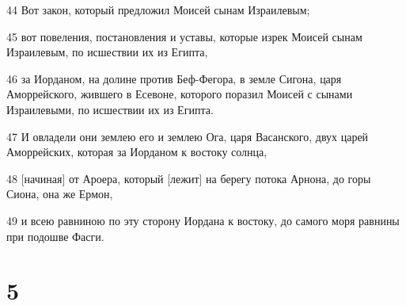 \par 44 Вот закон, который предложил Моисей сынам Израилевым;
\par 45 вот повеления, постановления и уставы, которые изрек Моисей сынам Израилевым, по исшествии их из Египта,
\par 46 за Иорданом, на долине против Беф-Фегора, в земле Сигона, царя Аморрейского, жившего в Есевоне, которого поразил Моисей с сынами Израилевыми, по исшествии их из Египта.
\par 47 И овладели они землею его и землею Ога, царя Васанского, двух царей Аморрейских, которая за Иорданом к востоку солнца,
\par 48 [начиная] от Ароера, который [лежит] на берегу потока Арнона, до горы Сиона, она же Ермон,
\par 49 и всею равниною по эту сторону Иордана к востоку, до самого моря равнины при подошве Фасги.

\chapter{5}

